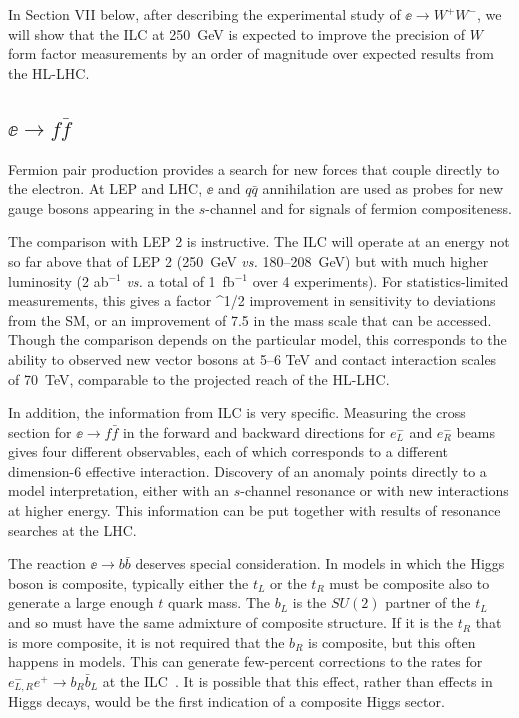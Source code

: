 In Section VII  below, after describing the experimental study of $\ee\to W^+W^-$, we will show that the ILC at 250~GeV is expected to improve the precision of $W$ form factor measurements by an order of magnitude over expected results from the HL-LHC.




\subsection{$\ee\to f\bar f$}
\label{subsec:phys_ff}

Fermion pair production provides a search for new forces that couple directly to the electron.   At LEP and LHC, $\ee$ and $q\bar q$ annihilation are used as probes for new gauge bosons appearing in the $s$-channel and for signals of fermion compositeness. 

The comparison with LEP 2 is instructive.   The ILC will operate at an energy not so far above that of LEP 2  (250~GeV {\it vs.}  180--208~GeV)  but with much higher luminosity (2 ab$^{-1}$  {\it vs.} a total of 1~fb$^{-1}$ over 4 experiments).   For statistics-limited measurements, this gives a factor 
\beq
   ^{1/2}  
\eeqn
improvement in sensitivity to deviations from the SM, or an improvement of  7.5 in the mass scale that can be accessed.   Though the comparison depends on the particular model, this corresponds to the ability to observed new vector bosons at 5--6 TeV and 
contact interaction scales of 70~TeV, comparable to  the projected reach of the HL-LHC. 

 In addition, the information from ILC is very specific.   Measuring the cross section for $\ee\to f\bar f$ in the forward and backward directions for $e^-_L$ and $e^-_R$ beams gives four  different observables, each of which corresponds to a different dimension-6 effective  interaction.   Discovery of an anomaly points directly to a model interpretation, either with an $s$-channel resonance or with new interactions at higher energy.   This information can be put together with results of resonance searches at the LHC. 

The reaction $\ee\to b\bar b$ deserves special consideration. In models in which the Higgs boson is composite, typically either the $t_L$ or the $t_R$ must be composite also to generate a large enough $t$ quark mass.    The $b_L$ is the $SU(2)$ partner of the $t_L$ and so must have the same admixture of composite structure.    If it is the $t_R$ that is more composite, it is not required that the $b_R$ is composite, but this often happens in models.  This can generate few-percent corrections to the rates for $e^-_{L,R} e^+\to b_R\bar b_L$ at the ILC~\cite{Funatsu:2017nfm,Yoon:2018xud}.   It is possible that this effect, rather than effects in Higgs decays, would be the first indication of a composite Higgs sector. 

